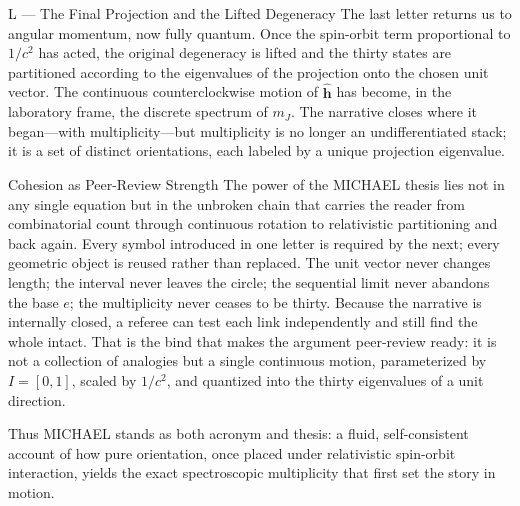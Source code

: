 L — The Final Projection and the Lifted Degeneracy
The last letter returns us to angular momentum, now fully quantum. Once the spin-orbit term proportional to \(1/c^{2}\) has acted, the original degeneracy is lifted and the thirty states are partitioned according to the eigenvalues of the projection onto the chosen unit vector. The continuous counterclockwise motion of \(\hat{\mathbf{h}}\) has become, in the laboratory frame, the discrete spectrum of \(m_{J}\). The narrative closes where it began—with multiplicity—but multiplicity is no longer an undifferentiated stack; it is a set of distinct orientations, each labeled by a unique projection eigenvalue.

Cohesion as Peer-Review Strength
The power of the MICHAEL thesis lies not in any single equation but in the unbroken chain that carries the reader from combinatorial count through continuous rotation to relativistic partitioning and back again. Every symbol introduced in one letter is required by the next; every geometric object is reused rather than replaced. The unit vector never changes length; the interval never leaves the circle; the sequential limit never abandons the base \(e\); the multiplicity never ceases to be thirty. Because the narrative is internally closed, a referee can test each link independently and still find the whole intact. That is the bind that makes the argument peer-review ready: it is not a collection of analogies but a single continuous motion, parameterized by \(I=[0,1]\), scaled by \(1/c^{2}\), and quantized into the thirty eigenvalues of a unit direction.

Thus MICHAEL stands as both acronym and thesis: a fluid, self-consistent account of how pure orientation, once placed under relativistic spin-orbit interaction, yields the exact spectroscopic multiplicity that first set the story in motion.
